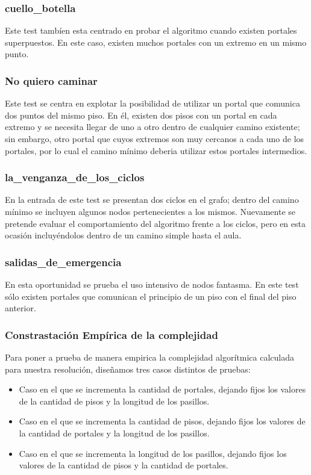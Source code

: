 \subsubsection{cuello_botella}
Este test tambíen esta centrado en probar el algoritmo cuando existen portales superpuestos. En este caso, existen muchos portales con un extremo en un mismo punto.

\subsubsection{No quiero caminar}
Este test se centra en explotar la posibilidad de utilizar un portal que comunica dos puntos del mismo piso. En él, existen dos pisos con un portal en cada extremo y se necesita llegar de uno a otro dentro de cualquier camino existente; sin embargo, otro portal que cuyos extremos son muy cercanos a cada uno de los portales, por lo cual el camino mínimo deberia utilizar estos portales intermedios.

\subsubsection{la_venganza_de_los_ciclos}
En la entrada de este test se presentan dos ciclos en el grafo; dentro del camino mínimo se incluyen algunos nodos pertenecientes a los mismos. Nuevamente se pretende evaluar el comportamiento del algoritmo frente a los ciclos, pero en esta ocasión incluyéndolos dentro de un camino simple hasta el aula.

\subsubsection{salidas_de_emergencia}
En esta oportunidad se prueba el uso intensivo de nodos fantasma. En este test sólo existen portales que comunican el principio de un piso con el final del piso anterior.

\subsubsection{Constrastación Empírica de la complejidad}
Para poner a prueba de manera empirica la complejidad algorítmica calculada para nuestra resolución, diseñamos tres casos distintos de pruebas:
\begin{itemize}
\item{Caso en el que se incrementa la cantidad de portales, dejando fijos los valores de la cantidad de pisos y la longitud de los pasillos.}
\item{Caso en el que se incrementa la cantidad de pisos, dejando fijos los valores de la cantidad de portales y la longitud de los pasillos.}
\item{Caso en el que se incrementa la longitud de los pasillos, dejando fijos los valores de la cantidad de pisos y la cantidad de portales.}
\end{itemize}

